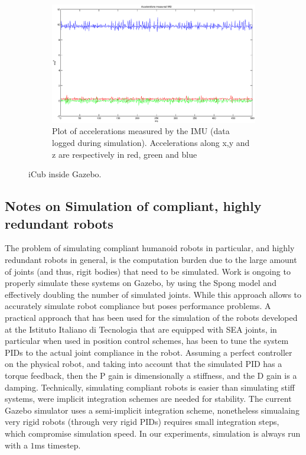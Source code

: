 \begin{figure}
\begin{subfigure}[b]{0.475\textwidth}
                \includegraphics[width=\textwidth]{images/icub_imu_c.eps}
                \caption{Plot of accelerations measured by the IMU (data logged during simulation). Accelerations along x,y and z are respectively in red, green and blue}
                \label{yarp_simulation_icub_c}
        \end{subfigure}
        \caption{iCub inside Gazebo.}\label{icub_inertial}
\end{figure}

\subsection{Notes on Simulation of compliant, highly redundant robots}
The problem of simulating compliant humanoid robots in particular, and highly redundant robots in general, is the computation burden due to the large amount of joints (and thus, rigit bodies) that need to be simulated.
Work is ongoing to properly simulate these systems on Gazebo, by using the Spong model and effectively doubling the number of simulated joints. While this approach allows to accurately simulate robot compliance but poses performance problems.
A practical approach that has been used for the simulation of the robots developed at the Istituto Italiano di Tecnologia that are equipped with SEA joints, in particular when used in position control schemes, has been to tune the system PIDs to the actual joint compliance in the robot. Assuming a perfect controller on the physical robot, and taking into account that the simulated PID has a torque feedback, then the P gain is dimensionally a stiffness, and the D gain is a damping.
Technically, simulating compliant robots is easier than simulating stiff systems, were implicit integration schemes are needed for stability. 
The current Gazebo simulator uses a semi-implicit integration scheme, nonetheless simualaing very rigid robots (through very rigid PIDs) requires small integration steps, which compromise simulation speed. In our experiments, simulation is always run with a $1$ms timestep.

